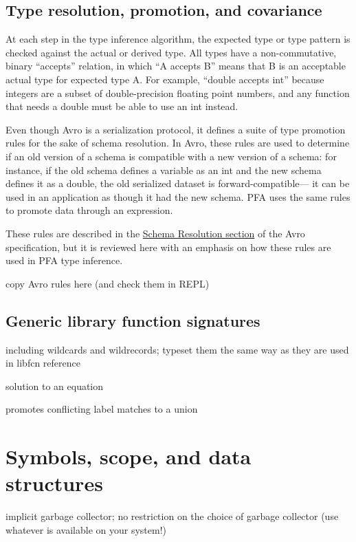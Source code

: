\documentclass{article}
\theoremstyle{definition}
\begin{document}
\subsection{Type resolution, promotion, and covariance}

At each step in the type inference algorithm, the expected type or type pattern is checked against the actual or derived type.  All types have a non-commutative, binary ``accepts'' relation, in which ``A accepts B'' means that B is an acceptable actual type for expected type A.  For example, ``double accepts int'' because integers are a subset of double-precision floating point numbers, and any function that needs a double must be able to use an int instead.

Even though Avro is a serialization protocol, it defines a suite of type promotion rules for the sake of schema resolution.  In Avro, these rules are used to determine if an old version of a schema is compatible with a new version of a schema: for instance, if the old schema defines a variable as an int and the new schema defines it as a double, the old serialized dataset is forward-compatible--- it can be used in an application as though it had the new schema.  PFA uses the same rules to promote data through an expression.

These rules are described in the \href{http://avro.apache.org/docs/1.7.6/spec.html#Schema+Resolution}{Schema Resolution section} of the Avro specification, but it is reviewed here with an emphasis on how these rules are used in PFA type inference.

 


copy Avro rules here (and check them in REPL)

\subsection{Generic library function signatures}

including wildcards and wildrecords; typeset them the same way as they are used in libfcn reference

solution to an equation

promotes conflicting label matches to a union

\pagebreak

\section{Symbols, scope, and data structures}

implicit garbage collector; no restriction on the choice of garbage collector (use whatever is available on your system!)
\end{document}
